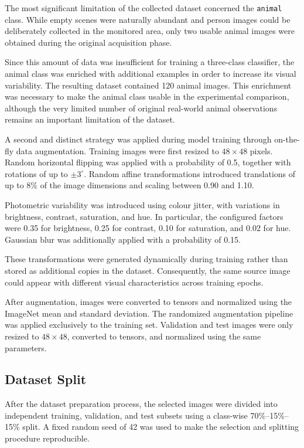\documentclass{article}
\begin{document}
The most significant limitation of the collected dataset concerned the
\texttt{animal} class. While empty scenes were naturally abundant and
person images could be deliberately collected in the monitored area, only
two usable animal images were obtained during the original acquisition
phase.

Since this amount of data was insufficient for training a three-class
classifier, the animal class was enriched with additional examples in order
to increase its visual variability. The resulting dataset contained 120
animal images. This enrichment was necessary to make the animal class
usable in the experimental comparison, although the very limited number
of original real-world animal observations remains an important limitation
of the dataset.

A second and distinct strategy was applied during model training through
on-the-fly data augmentation. Training images were first resized to
$48 \times 48$ pixels. Random horizontal flipping was applied with a
probability of 0.5, together with rotations of up to $\pm 3^\circ$.
Random affine transformations introduced translations of up to 8\% of the
image dimensions and scaling between 0.90 and 1.10.

Photometric variability was introduced using colour jitter, with variations
in brightness, contrast, saturation, and hue. In particular, the configured
factors were 0.35 for brightness, 0.25 for contrast, 0.10 for saturation,
and 0.02 for hue. Gaussian blur was additionally applied with a probability
of 0.15.

These transformations were generated dynamically during training rather
than stored as additional copies in the dataset. Consequently, the same
source image could appear with different visual characteristics across
training epochs.

After augmentation, images were converted to tensors and normalized using
the ImageNet mean and standard deviation. The randomized augmentation
pipeline was applied exclusively to the training set. Validation and test
images were only resized to $48 \times 48$, converted to tensors, and
normalized using the same parameters.


\subsection{Dataset Split}
\label{subsec:dataset-split}

After the dataset preparation process, the selected images were divided
into independent training, validation, and test subsets using a class-wise
70\%--15\%--15\% split. A fixed random seed of 42 was used to make the
selection and splitting procedure reproducible.
\end{document}
